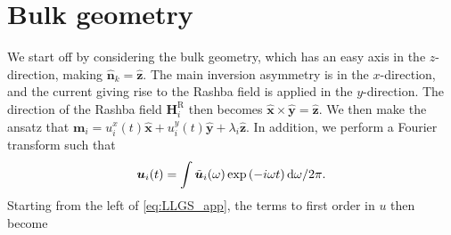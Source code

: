 \section{Bulk geometry}
We start off by considering the bulk geometry, which has an easy axis in the $z$-direction, making $\mathbold{\hat{n}}_k = \mathbold{\hat{z}}$. The main inversion asymmetry is in the $x$-direction, and the current giving rise to the Rashba field is applied in the $y$-direction. The direction of the Rashba field $\mathbold{H}^{\text{R}}_i$ then becomes $\mathbold{\hat{x}}\times\mathbold{\hat{y}}=\mathbold{\hat{z}}$. We then make the ansatz that $\mathbold{m}_i = u^x_i(t)\mathbold{\hat{x}}+u^y_i(t)\mathbold{\hat{y}}+\lambda_i \mathbold{\hat{z}}$. In addition, we perform a Fourier transform such that 
\begin{align}
\label{eq:FourierTransform}
\mathbold{u}_i(t) = \int \tilde{\mathbold{u}}_i(\omega) \exp\left(-i\omega t\right) \d \omega/{2\pi}.
\end{align}
Starting from the left of \eqref{eq:LLGS_app}, the terms to first order in $u$ then become
